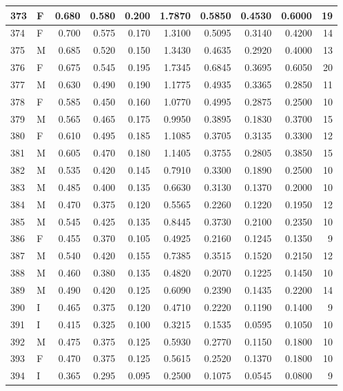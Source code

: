 \documentclass[9pt,twocolumn,twoside,]{pnas-new}
\begin{document}
\begin{tabular}{l|l|r|r|r|r|r|r|r|r}
\hline
373 & F & 0.680 & 0.580 & 0.200 & 1.7870 & 0.5850 & 0.4530 & 0.6000 & 19\\
\hline
374 & F & 0.700 & 0.575 & 0.170 & 1.3100 & 0.5095 & 0.3140 & 0.4200 & 14\\
\hline
375 & M & 0.685 & 0.520 & 0.150 & 1.3430 & 0.4635 & 0.2920 & 0.4000 & 13\\
\hline
376 & F & 0.675 & 0.545 & 0.195 & 1.7345 & 0.6845 & 0.3695 & 0.6050 & 20\\
\hline
377 & M & 0.630 & 0.490 & 0.190 & 1.1775 & 0.4935 & 0.3365 & 0.2850 & 11\\
\hline
378 & F & 0.585 & 0.450 & 0.160 & 1.0770 & 0.4995 & 0.2875 & 0.2500 & 10\\
\hline
379 & M & 0.565 & 0.465 & 0.175 & 0.9950 & 0.3895 & 0.1830 & 0.3700 & 15\\
\hline
380 & F & 0.610 & 0.495 & 0.185 & 1.1085 & 0.3705 & 0.3135 & 0.3300 & 12\\
\hline
381 & M & 0.605 & 0.470 & 0.180 & 1.1405 & 0.3755 & 0.2805 & 0.3850 & 15\\
\hline
382 & M & 0.535 & 0.420 & 0.145 & 0.7910 & 0.3300 & 0.1890 & 0.2500 & 10\\
\hline
383 & M & 0.485 & 0.400 & 0.135 & 0.6630 & 0.3130 & 0.1370 & 0.2000 & 10\\
\hline
384 & M & 0.470 & 0.375 & 0.120 & 0.5565 & 0.2260 & 0.1220 & 0.1950 & 12\\
\hline
385 & M & 0.545 & 0.425 & 0.135 & 0.8445 & 0.3730 & 0.2100 & 0.2350 & 10\\
\hline
386 & F & 0.455 & 0.370 & 0.105 & 0.4925 & 0.2160 & 0.1245 & 0.1350 & 9\\
\hline
387 & M & 0.540 & 0.420 & 0.155 & 0.7385 & 0.3515 & 0.1520 & 0.2150 & 12\\
\hline
388 & M & 0.460 & 0.380 & 0.135 & 0.4820 & 0.2070 & 0.1225 & 0.1450 & 10\\
\hline
389 & M & 0.490 & 0.420 & 0.125 & 0.6090 & 0.2390 & 0.1435 & 0.2200 & 14\\
\hline
390 & I & 0.465 & 0.375 & 0.120 & 0.4710 & 0.2220 & 0.1190 & 0.1400 & 9\\
\hline
391 & I & 0.415 & 0.325 & 0.100 & 0.3215 & 0.1535 & 0.0595 & 0.1050 & 10\\
\hline
392 & M & 0.475 & 0.375 & 0.125 & 0.5930 & 0.2770 & 0.1150 & 0.1800 & 10\\
\hline
393 & F & 0.470 & 0.375 & 0.125 & 0.5615 & 0.2520 & 0.1370 & 0.1800 & 10\\
\hline
394 & I & 0.365 & 0.295 & 0.095 & 0.2500 & 0.1075 & 0.0545 & 0.0800 & 9\\

\end{tabular}
\end{document}
